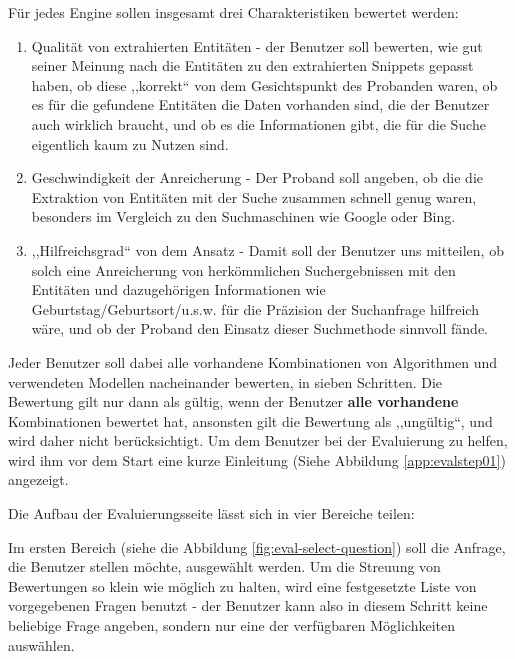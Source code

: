 Für jedes Engine sollen insgesamt drei Charakteristiken bewertet werden:
\begin{enumerate}
\item Qualität von extrahierten Entitäten - der Benutzer soll bewerten, wie gut seiner Meinung nach die Entitäten zu den extrahierten Snippets gepasst haben, ob diese ,,korrekt`` von dem Gesichtspunkt des Probanden waren, ob es für die gefundene Entitäten die Daten vorhanden sind, die der Benutzer auch wirklich braucht, und ob es die Informationen gibt, die für die Suche eigentlich kaum zu Nutzen sind.
\item Geschwindigkeit der Anreicherung - Der Proband soll angeben, ob die die Extraktion von Entitäten mit der Suche zusammen schnell genug waren, besonders im Vergleich zu den Suchmaschinen wie Google oder Bing.
\item ,,Hilfreichsgrad`` von dem Ansatz - Damit soll der Benutzer uns mitteilen, ob solch eine Anreicherung von herkömmlichen Suchergebnissen mit den Entitäten und dazugehörigen Informationen wie Geburtstag/Geburtsort/u.s.w. für die Präzision der Suchanfrage hilfreich wäre, und ob der Proband den Einsatz dieser Suchmethode sinnvoll fände.  
\end{enumerate}
Jeder Benutzer soll dabei alle vorhandene Kombinationen von Algorithmen und verwendeten Modellen nacheinander bewerten, in sieben Schritten. Die Bewertung gilt nur dann als gültig, wenn der Benutzer \textbf{alle vorhandene} Kombinationen bewertet hat, ansonsten gilt die Bewertung als ,,ungültig``, und wird daher nicht berücksichtigt. Um dem Benutzer bei der Evaluierung zu helfen, wird ihm vor dem Start eine kurze Einleitung (Siehe Abbildung \ref{app:evalstep01}) angezeigt.

Die Aufbau der Evaluierungsseite lässt sich in vier Bereiche teilen:

Im ersten Bereich (siehe die Abbildung \ref{fig:eval-select-question}) soll die Anfrage, die Benutzer stellen möchte, ausgewählt werden. Um die Streuung von Bewertungen so klein wie möglich zu halten, wird eine festgesetzte Liste von vorgegebenen Fragen benutzt - der Benutzer kann also in diesem Schritt keine beliebige Frage angeben, sondern nur eine der verfügbaren Möglichkeiten auswählen.

